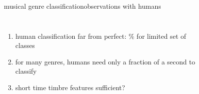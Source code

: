         \begin{frame}{musical genre classification}{observations with humans}
            \begin{columns}
                    \begin{enumerate}
                        \item   human classification far from perfect: \unit[75--90]{\%} for limited set of classes
                        \item<2-> for many genres, humans need only a fraction of a second to classify
                        \item<2->[$\Rightarrow$]	short time timbre features sufficient?
                    \end{enumerate}
                    \begin{figure}
                        \centering
\end{figure}
\end{columns}
\end{frame}
